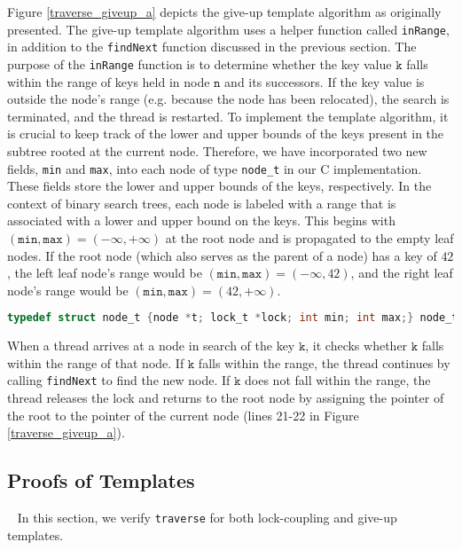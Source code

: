 \documentclass[a4paper,UKenglish,cleveref, autoref, thm-restate]{lipics-v2021}
\newcommand{\wm}[1]{\textbf{\textcolor{violet}{[Willam: #1]}}}
\begin{document}
Figure \ref{traverse_giveup_a} depicts the give-up template algorithm as originally presented. The give-up template algorithm uses a helper function called \lstinline{inRange}, in addition to the \lstinline{findNext} function discussed in the previous section. The purpose of the \lstinline{inRange} function is to determine whether the key value $\texttt{k}$ falls within the range of keys held in node $\texttt{n}$ and its successors. If the key value is outside the node's range (e.g. because the node has been relocated), the search is terminated, and the thread is restarted. To implement the template algorithm, it is crucial to keep track of the lower and upper bounds of the keys present in the subtree rooted at the current node. Therefore, we have incorporated two new fields, \lstinline{min} and \lstinline{max}, into each node of type \lstinline{node_t} in our C implementation. These fields store the lower and upper bounds of the keys, respectively. In the context of binary search trees, each node is labeled with a range that is associated with a lower and upper bound on the keys. This begins with $(\texttt{min}, \texttt{max}) = (-\infty, +\infty)$ at the root node and is propagated to the empty leaf nodes. If the root node (which also serves as the parent of a node) has a key of $42$, the left leaf node's range would be $(\texttt{min}, \texttt{max}) = (-\infty, 42)$, and the right leaf node's range would be $(\texttt{min}, \texttt{max}) = (42, +\infty)$.

\begin{lstlisting}[language = C, backgroundcolor=\color{white}, basicstyle=\ttfamily\footnotesize]
	typedef struct node_t {node *t; lock_t *lock; int min; int max;} node_t;
\end{lstlisting}



When a thread arrives at a node in search of the key $\texttt{k}$, it checks whether $\texttt{k}$ falls within the range of that node. If $\texttt{k}$ falls within the range, the thread continues by calling \lstinline{findNext} to find the new node. If $\texttt{k}$ does not fall within the range, the thread releases the lock and returns to the root node by assigning the pointer of the root to the pointer of the current node (lines 21-22 in Figure \ref{traverse_giveup_a}).

\subsection{Proofs of Templates} \
In this section, we verify \lstinline{traverse} for both lock-coupling and give-up templates.  
\end{document}
